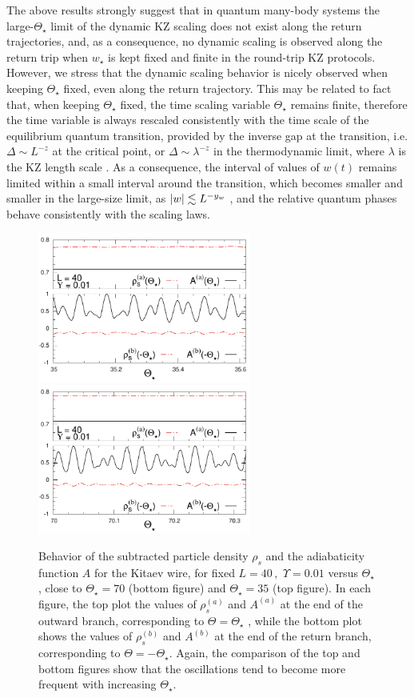 The above results strongly suggest that in quantum many-body systems the 
large-$\Theta_\star$ limit of the dynamic KZ scaling does not exist along the return 
trajectories, and, as a consequence, no dynamic scaling is observed along the
return trip when $w_\star$ is kept fixed and finite in the
round-trip KZ protocols.\\

However, we stress that the dynamic scaling behavior
is nicely observed when keeping $\Theta_\star$ fixed, even along the
return trajectory. This may be related to fact that, when
keeping $\Theta_\star$ fixed, the time scaling variable $\Theta_\star$ remains 
finite, therefore the time variable is always rescaled 
consistently with the time scale of the equilibrium quantum
transition, provided by the inverse gap at the transition,
i.e. $\Delta \sim  L^{-z}$ at the critical point, or $\Delta \sim \lambda^{-z}$ 
in the thermodynamic limit, where $\lambda$ is the KZ length scale %
. As a consequence, the interval of values of $w(t)$ remains 
limited within a small interval around the transition, which
becomes smaller and smaller in the large-size limit, as
$\lvert w\rvert \lesssim L^{-y_w}$ , and the relative quantum phases behave
consistently with the scaling laws.

\begin{figure}[!t]
        \centering
        \includegraphics[width=7cm]{imm/diffThstaru001T35l40.pdf}
	\includegraphics[width=7cm]{imm/diffThstaru001T70l40.pdf}
	\caption{Behavior of the subtracted particle density $\rho_s$
	 and the adiabaticity function $A$ for the Kitaev wire,
	for fixed $L = 40\,,\,\, \Upsilon = 0.01$ versus $\Theta_\star$ , 
	close to $\Theta_\star = 70$
	(bottom figure) and $\Theta_\star = 35$ (top figure). In each figure,
	the top plot the values of $\rho_s^{(a)}$ and $A^{(a)}$ at the end of the
	outward branch, corresponding to $\Theta = \Theta_\star$ , while the bottom
	plot shows the values of $\rho_s^{(b)}$ and $A^{(b)}$ at the end of the return
	branch, corresponding to $\Theta = -\Theta_\star$. Again, the comparison
	of the top and bottom figures show that the oscillations tend
	to become more frequent with increasing $\Theta_\star$. }
	\label{oscill}
\end{figure}


